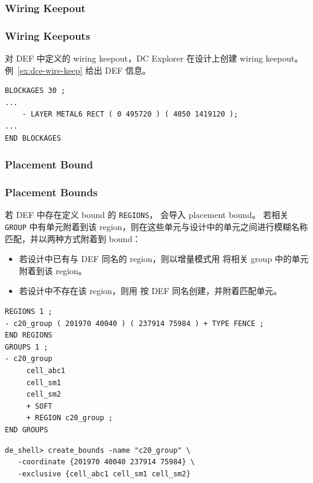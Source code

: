 \subsubsection{Wiring Keepout}
\subsubsection*{Wiring Keepouts}

对 DEF 中定义的 wiring keepout，DC Explorer 在设计上创建 wiring keepout。例~\ref{ex:dce-wire-keep} 给出 DEF 信息。

\begin{lstlisting}[caption={DEF wiring keepout},label={ex:dce-wire-keep}]
BLOCKAGES 30 ;
...
    - LAYER METAL6 RECT ( 0 495720 ) ( 4050 1419120 );
...
END BLOCKAGES
\end{lstlisting}

\subsubsection{Placement Bound}
\subsubsection*{Placement Bounds}

若 DEF 中存在定义 bound 的 \texttt{REGIONS}， 会导入 placement bound。
若相关 \texttt{GROUP} 中有单元附着到该 region，则在这些单元与设计中的单元之间进行模糊名称匹配，并以两种方式附着到 bound：
\begin{itemize}
  \item 若设计中已有与 DEF 同名的 region，则以增量模式用  将相关 group 中的单元附着到该 region。
  \item 若设计中不存在该 region，则用  按 DEF 同名创建，并附着匹配单元。
\end{itemize}

\begin{lstlisting}[caption={导入的 placement bound 信息},label={ex:dce-bound-def}]
REGIONS 1 ;
- c20_group ( 201970 40040 ) ( 237914 75984 ) + TYPE FENCE ;
END REGIONS
GROUPS 1 ;
- c20_group
     cell_abc1
     cell_sm1
     cell_sm2
     + SOFT
     + REGION c20_group ;
END GROUPS
\end{lstlisting}

\begin{lstlisting}[caption={等价 Tcl},label={ex:dce-bound-tcl}]
de_shell> create_bounds -name "c20_group" \
   -coordinate {201970 40040 237914 75984} \
   -exclusive {cell_abc1 cell_sm1 cell_sm2}
\end{lstlisting}

